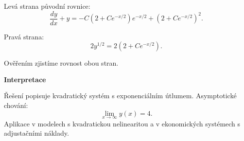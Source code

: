 \begin{example}
    Levá strana původní rovnice:
    \[
    \frac{dy}{dx} + y = -C(2 + Ce^{-x/2})e^{-x/2} + (2 + Ce^{-x/2})^2.
    \]
    
    Pravá strana:
    \[
    2y^{1/2} = 2(2 + Ce^{-x/2}).
    \]
    
    Ověřením zjistíme rovnost obou stran.
    
    \vspace{1.5\baselineskip}
    
    \noindent\textbf{Interpretace}
    
    Řešení popisuje kvadratický systém s exponenciálním útlumem. Asymptotické chování:
    \[
    \lim_{x \to \infty} y(x) = 4.
    \]
    Aplikace v modelech s kvadratickou nelinearitou a v ekonomických systémech s adjustačními náklady.
    
    \end{example}
    
    \vspace{2\baselineskip}
    
